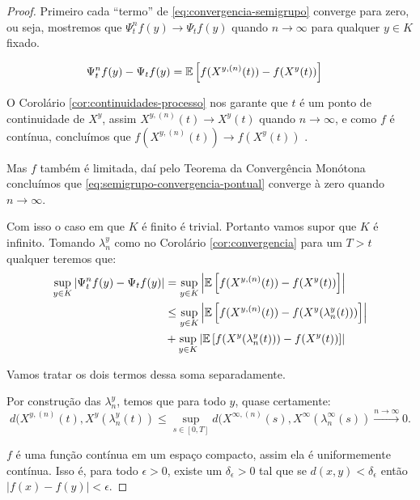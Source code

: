 \begin{proof}

  Primeiro cada ``termo'' de \eqref{eq:convergencia-semigrupo}
  converge para zero, ou seja, mostremos que $\Psi^n_t f (y) \to
  \Psi_t f(y)$ quando $n \to \infty$ para qualquer $y \in K$ fixado.

  \begin{align}
    \label{eq:semigrupo-convergencia-pontual}
    \Psi^n_t f (y) -\Psi_t f(y) &=
    {\mathbb{E}} \left[
      f(X^{y, (n)}(t)) - f(X^y(t))
    \right]
  \end{align}

  O Corolário \ref{cor:continuidades-processo} nos garante que $t$ é
  \qc um ponto de continuidade de $X^y$, assim $X^{y, (n)}(t) \to
  X^y(t)$ \qc quando $n \to \infty$, e como $f$ é contínua, concluímos
  que $f(X^{y, (n)}(t)) \to f(X^y(t))$ \qc.

  Mas $f$ também é limitada, daí pelo Teorema da Convergência Monótona
  concluímos que \eqref{eq:semigrupo-convergencia-pontual} converge à
  zero quando $n \to \infty$.

  Com isso o caso em que $K$ é finito é trivial. Portanto vamos supor
  que $K$ é infinito. Tomando $\lambda_n^y$ como no Corolário
  \ref{cor:convergencia} para um $T > t$ qualquer teremos que:
  \begin{align}
    \label{eq:esperancas-markov}
    \sup_{y \in K} | \Psi^n_t f (y) - \Psi_t f(y) | 
    &= \sup_{y \in K} \left\lvert {\mathbb{E}} \left[f(X^{y, (n)}(t)) -
        f(X^y(t)) \right]\right\rvert \\
    &\leq \sup_{y\in K}\left\lvert {\mathbb{E}} \left[f(X^{y, (n)}(t)) -
        f(X^y(\lambda_n^y(t))) \right]
    \right\rvert \notag \\
    &+ \sup_{y\in K}\left\lvert {\mathbb{E}} \left[f(X^y(\lambda_n^y(t))) -
        f(X^y(t)) \right] \right\rvert \notag
  \end{align}

  Vamos tratar os dois termos dessa soma separadamente.

  Por construção das $\lambda_n^y$, temos que para todo $y$, quase certamente:
  \begin{displaymath}
    d(X^{y, (n)}(t), X^y(\lambda_n^y(t)) \leq
    \sup_{s \in [0, T]} d(X^{\infty, (n)}(s), X^\infty(\lambda_n^\infty(s))
    \xrightarrow{n\to\infty} 0.
  \end{displaymath}

  $f$ é uma função contínua em um espaço compacto, assim ela é
  uniformemente contínua. Isso é, para todo $\epsilon > 0$, existe um
  $\delta_\epsilon > 0$ tal que se $d(x, y) < \delta_\epsilon$ então
  $|f(x)-f(y)| < \epsilon$.


\end{proof}
